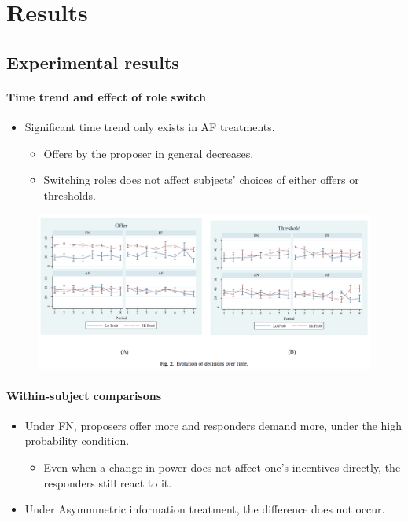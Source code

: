 \documentclass[../root]{subfiles}
\begin{document}
    \section{Results}

    \subsection{Experimental results}

    \paragraph{Time trend and effect of role switch}

    \begin{itemize}
      \item Significant time trend only exists in AF treatments.
      \begin{itemize}
        \item Offers by the proposer in general decreases.
        \item Switching roles does not affect subjects' choices of either offers or thresholds.
      \end{itemize}
    \end{itemize}

    \begin{figure}[ht]
      \centering
      \includegraphics[scale = .8]{1106tanji/F2}
    \end{figure}

    \paragraph{Within-subject comparisons}

    \begin{itemize}
      \item Under FN, proposers offer more and responders demand more, under the high probability condition.
      \begin{itemize}
        \item Even when a change in power does not affect one's incentives directly, the responders still react to it.
      \end{itemize}
      \item Under Asymmmetric information treatment, the difference does not occur.
    \end{itemize}
\end{document}
